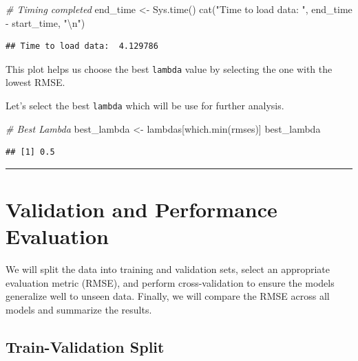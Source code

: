 \documentclass[
]{article}
\newenvironment{Shaded}{}{}
\newcommand{\CommentTok}[1]{\textcolor[rgb]{0.38,0.63,0.69}{\textit{#1}}}
\newcommand{\FunctionTok}[1]{\textcolor[rgb]{0.02,0.16,0.49}{#1}}
\newcommand{\NormalTok}[1]{#1}
\newcommand{\OtherTok}[1]{\textcolor[rgb]{0.00,0.44,0.13}{#1}}
\newcommand{\SpecialCharTok}[1]{\textcolor[rgb]{0.25,0.44,0.63}{#1}}
\newcommand{\StringTok}[1]{\textcolor[rgb]{0.25,0.44,0.63}{#1}}
\begin{document}
\begin{Shaded}
\begin{Highlighting}[]
\CommentTok{\# Timing completed}
\NormalTok{end\_time }\OtherTok{\textless{}{-}} \FunctionTok{Sys.time}\NormalTok{()}
\FunctionTok{cat}\NormalTok{(}\StringTok{"Time to load data: "}\NormalTok{, end\_time }\SpecialCharTok{{-}}\NormalTok{ start\_time, }\StringTok{"}\SpecialCharTok{\textbackslash{}n}\StringTok{"}\NormalTok{)}
\end{Highlighting}
\end{Shaded}

\begin{verbatim}
## Time to load data:  4.129786
\end{verbatim}

This plot helps us choose the best \texttt{lambda} value by selecting
the one with the lowest RMSE.

Let's select the best \texttt{lambda} which will be use for further
analysis.

\begin{Shaded}
\begin{Highlighting}[]
\CommentTok{\# Best Lambda}
\NormalTok{best\_lambda }\OtherTok{\textless{}{-}}\NormalTok{ lambdas[}\FunctionTok{which.min}\NormalTok{(rmses)]}
\NormalTok{best\_lambda}
\end{Highlighting}
\end{Shaded}

\begin{verbatim}
## [1] 0.5
\end{verbatim}

\begin{center}\rule{0.5\linewidth}{0.5pt}\end{center}

\section{Validation and Performance
Evaluation}\label{validation-and-performance-evaluation}

We will split the data into training and validation sets, select an
appropriate evaluation metric (RMSE), and perform cross-validation to
ensure the models generalize well to unseen data. Finally, we will
compare the RMSE across all models and summarize the results.

\subsection{Train-Validation Split}\label{train-validation-split}
\end{document}
